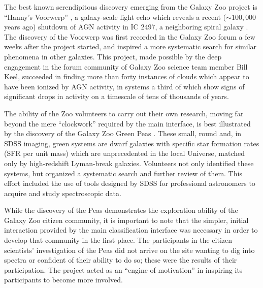 \documentclass{ar2e}
\begin{document}


The best known serendipitous discovery emerging from the Galaxy Zoo project is
``Hanny's Voorwerp'' \citep{Lintott++2009}, a galaxy-scale light echo which
reveals a recent ($\sim 100,000$ years ago)  shutdown of AGN activity in IC
2497, a neighboring spiral galaxy \citep{Keel++2012}. 
The discovery of the Voorwerp was first
recorded in the Galaxy Zoo forum a few weeks after the project started, and
inspired a more systematic search for similar phenomena in other galaxies. This
project, made possible by the deep engagement in the forum community of Galaxy
Zoo science team member Bill Keel, succeeded in finding more than forty
instances of clouds which appear to have been ionized by AGN activity, in
systems a third of which show signs of significant drops in activity on a
timescale of tens of thousands of years.  

The ability of the Zoo volunteers to carry out their own research, moving far
beyond the mere ``clockwork'' required by the main interface, is best
illustrated by the discovery of the Galaxy Zoo Green Peas
\citep{Cardamone++2009}. These small, round and, in SDSS imaging, green systems
are dwarf galaxies with specific star formation rates (SFR per unit mass) which
are unprecedented in the local Universe, matched only by high-redshift
Lyman-break galaxies. Volunteers not only identified these systems, but
organized a systematic search and further review of them. This effort included
the use of tools designed by SDSS for professional astronomers to acquire and
study spectroscopic data. 

While the discovery of the Peas demonstrates the exploration ability of the
Galaxy Zoo citizen community, it is important to note that the simpler, initial
interaction provided by the main classification interface was necessary in order
to develop that community in the first place. The participants in the citizen
scientists' investigation of the Peas did not arrive on the site wanting to dig
into spectra or confident of their ability to do so; these were the results of
their participation. The project acted as an ``engine of motivation'' in
inspiring its participants to become more involved. 


\end{document}
